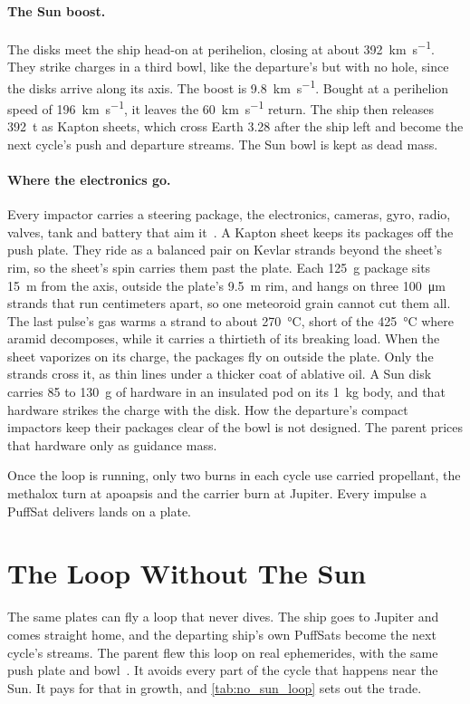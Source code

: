 \documentclass{article}
\begin{document}
\paragraph{The Sun boost.} The disks meet the ship head-on at perihelion, closing at about \SI{392}{\kilo\meter\per\second}. They strike charges in a third bowl, like the departure's but with no hole, since the disks arrive along its axis. The boost is \SI{9.8}{\kilo\meter\per\second}. Bought at a perihelion speed of \SI{196}{\kilo\meter\per\second}, it leaves the \SI{60}{\kilo\meter\per\second} return. The ship then releases \SI{392}{\tonne} as Kapton sheets, which cross Earth \SI{3.28}{\year} after the ship left and become the next cycle's push and departure streams. The Sun bowl is kept as dead mass.

\paragraph{Where the electronics go.} Every impactor carries a steering package, the electronics, cameras, gyro, radio, valves, tank and battery that aim it~\cite{katz2026aim}. A Kapton sheet keeps its packages off the push plate. They ride as a balanced pair on Kevlar strands beyond the sheet's rim, so the sheet's spin carries them past the plate. Each \SI{125}{\gram} package sits \SI{15}{\meter} from the axis, outside the plate's \SI{9.5}{\meter} rim, and hangs on three \SI{100}{\micro\meter} strands that run centimeters apart, so one meteoroid grain cannot cut them all. The last pulse's gas warms a strand to about \SI{270}{\celsius}, short of the \SI{425}{\celsius} where aramid decomposes, while it carries a thirtieth of its breaking load. When the sheet vaporizes on its charge, the packages fly on outside the plate. Only the strands cross it, as thin lines under a thicker coat of ablative oil. A Sun disk carries 85 to \SI{130}{\gram} of hardware in an insulated pod on its \SI{1}{\kilogram} body, and that hardware strikes the charge with the disk. How the departure's compact impactors keep their packages clear of the bowl is not designed. The parent prices that hardware only as guidance mass.

Once the loop is running, only two burns in each cycle use carried propellant, the methalox turn at apoapsis and the carrier burn at Jupiter. Every impulse a PuffSat delivers lands on a plate.

\section{The Loop Without The Sun}\label{sec:no_sun_loop}
The same plates can fly a loop that never dives. The ship goes to Jupiter and comes straight home, and the departing ship's own PuffSats become the next cycle's streams. The parent flew this loop on real ephemerides, with the same push plate and bowl~\cite{katz2026aim}. It avoids every part of the cycle that happens near the Sun. It pays for that in growth, and \autoref{tab:no_sun_loop} sets out the trade.
\end{document}
